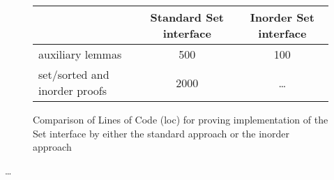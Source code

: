 
\begin{figure}
    \begin{tabular}{l|c|c}
        \                & Standard Set interface & Inorder Set interface \\
        \hline
        auxiliary lemmas & 500                    & 100                   \\
        set/sorted and inorder proofs & 2000      & \dots                 \\
    \end{tabular}
    \caption{Comparison of Lines of Code (loc) for proving implementation
    of the Set interface by either the standard approach or the inorder approach}
    \label{fig:proof-standard-inorder}
\end{figure}

\dots